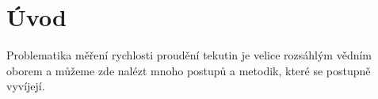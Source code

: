 \section{Úvod}

Problematika měření rychlosti proudění tekutin je velice rozsáhlým vědním oborem a můžeme zde nalézt mnoho postupů a metodik, které se postupně vyvíjejí.